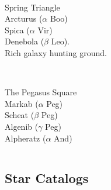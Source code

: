 \begin{frame}{\insertsubsubsectionhead}
  \begin{columns}[T,onlytextwidth]

    \centering

    \ \\
    \Large Spring Triangle \\[1ex]
    \large
    Arcturus ($\alpha$ Boo)\\
    Spica ($\alpha$ Vir)\\
    Denebola ($\beta$ Leo).\\
    Rich galaxy hunting ground.
    
  \end{columns}
\end{frame}


\begin{frame}{\insertsubsubsectionhead}
  \begin{columns}[T,onlytextwidth]

    \centering

    \ \\
    \Large The Pegasus Square \\[1ex]
    \large
     Markab ($\alpha$ Peg)\\
     Scheat ($\beta$ Peg)\\
     Algenib ($\gamma$ Peg)\\
     Alpheratz ($\alpha$ And)
    
  \end{columns}
\end{frame}

\subsection{Star Catalogs}

